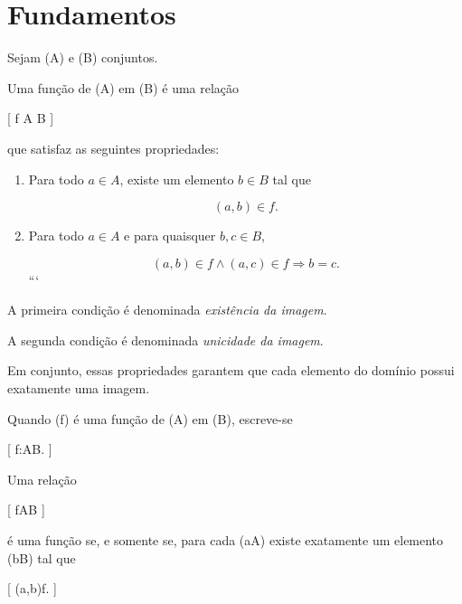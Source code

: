 \documentclass[../../main]{subfiles}
\begin{document}
\section{Fundamentos}
\label{sec:matematica:funcoes:fundamentos}

\begin{defn}[Função]
	\label{def:matematica:funcoes:fundamentos:funcao}

	Sejam (A) e (B) conjuntos.

	Uma função de (A) em (B) é uma relação

	[
	f \subseteq A \times B
	]

	que satisfaz as seguintes propriedades:

	\begin{enumerate}

		```
		\item Para todo \(a\in A\), existe um elemento
		      \(b\in B\) tal que

		      \[
			      (a,b)\in f.
		      \]

		\item Para todo \(a\in A\) e para quaisquer
		      \(b,c\in B\),

		      \[
			      (a,b)\in f
			      \land
			      (a,c)\in f
			      \Rightarrow
			      b=c.
		      \]
		      ```

	\end{enumerate}

\end{defn}

\begin{obs}

	A primeira condição é denominada
	\emph{existência da imagem}.

	A segunda condição é denominada
	\emph{unicidade da imagem}.

	Em conjunto, essas propriedades garantem que cada
	elemento do domínio possui exatamente uma imagem.

\end{obs}

\begin{notation}

	Quando (f) é uma função de (A) em (B),
	escreve-se

	[
	f:A\to B.
	]

\end{notation}

\begin{prop}
	\label{prop:matematica:funcoes:fundamentos:caracterizacao}

	Uma relação

	[
	f\subseteq A\times B
	]

	é uma função se, e somente se, para cada
	(a\in A) existe exatamente um elemento
	(b\in B) tal que

		[
			(a,b)\in f.
		]

\end{prop}
\end{document}
